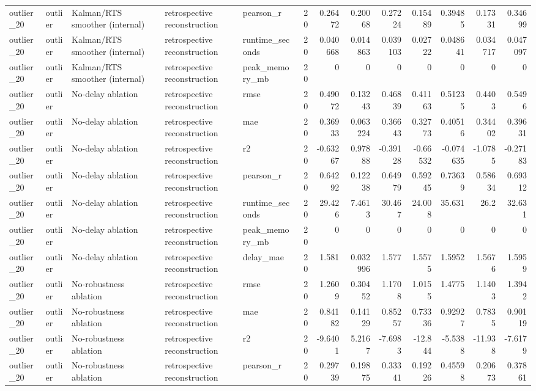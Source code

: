 \begin{table}[!htbp]
{{\begin{tabular}{lllllrrrrrrrr}
outlier_20 & outlier & Kalman/RTS smoother (internal) & retrospective reconstruction & pearson_r & 20 & 0.26472 & 0.20068 & 0.27224 & 0.15489 & 0.39485 & 0.17331 & 0.34699 \\
outlier_20 & outlier & Kalman/RTS smoother (internal) & retrospective reconstruction & runtime_seconds & 20 & 0.040668 & 0.014863 & 0.039103 & 0.02722 & 0.048641 & 0.034717 & 0.047097 \\
outlier_20 & outlier & Kalman/RTS smoother (internal) & retrospective reconstruction & peak_memory_mb & 20 & 0 & 0 & 0 & 0 & 0 & 0 & 0 \\
outlier_20 & outlier & No-delay ablation & retrospective reconstruction & rmse & 20 & 0.49072 & 0.13243 & 0.46839 & 0.41163 & 0.51235 & 0.4403 & 0.5496 \\
outlier_20 & outlier & No-delay ablation & retrospective reconstruction & mae & 20 & 0.36933 & 0.063224 & 0.36643 & 0.32773 & 0.40516 & 0.34402 & 0.39631 \\
outlier_20 & outlier & No-delay ablation & retrospective reconstruction & r2 & 20 & -0.63267 & 0.97888 & -0.39128 & -0.66532 & -0.074635 & -1.0785 & -0.27183 \\
outlier_20 & outlier & No-delay ablation & retrospective reconstruction & pearson_r & 20 & 0.64292 & 0.12238 & 0.64979 & 0.59245 & 0.73639 & 0.58634 & 0.69312 \\
outlier_20 & outlier & No-delay ablation & retrospective reconstruction & runtime_seconds & 20 & 29.426 & 7.4613 & 30.467 & 24.008 & 35.631 & 26.2 & 32.631 \\
outlier_20 & outlier & No-delay ablation & retrospective reconstruction & peak_memory_mb & 20 & 0 & 0 & 0 & 0 & 0 & 0 & 0 \\
outlier_20 & outlier & No-delay ablation & retrospective reconstruction & delay_mae & 20 & 1.581 & 0.032996 & 1.577 & 1.5575 & 1.5952 & 1.5676 & 1.5959 \\
outlier_20 & outlier & No-robustness ablation & retrospective reconstruction & rmse & 20 & 1.2609 & 0.30452 & 1.1708 & 1.0155 & 1.4775 & 1.1403 & 1.3942 \\
outlier_20 & outlier & No-robustness ablation & retrospective reconstruction & mae & 20 & 0.84182 & 0.14129 & 0.85257 & 0.73336 & 0.92927 & 0.7835 & 0.90119 \\
outlier_20 & outlier & No-robustness ablation & retrospective reconstruction & r2 & 20 & -9.6401 & 5.2167 & -7.6983 & -12.844 & -5.5388 & -11.938 & -7.6179 \\
outlier_20 & outlier & No-robustness ablation & retrospective reconstruction & pearson_r & 20 & 0.29739 & 0.19875 & 0.33341 & 0.19226 & 0.45598 & 0.20673 & 0.37861 \\

\end{tabular}}}
\end{table}
